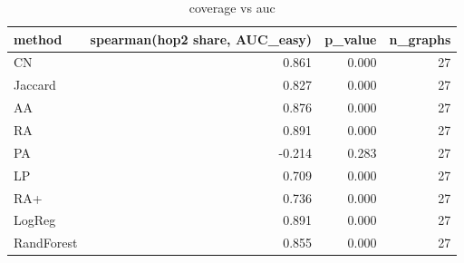 \begin{table}[t]
\centering
\caption{coverage vs auc}
\label{tab:coverage_vs_auc}
\begin{tabular}{lrrr}
\hline
method & spearman(hop2 share, AUC\_easy) & p\_value & n\_graphs \\
\hline
CN & 0.861 & 0.000 & 27 \\
Jaccard & 0.827 & 0.000 & 27 \\
AA & 0.876 & 0.000 & 27 \\
RA & 0.891 & 0.000 & 27 \\
PA & -0.214 & 0.283 & 27 \\
LP & 0.709 & 0.000 & 27 \\
RA+ & 0.736 & 0.000 & 27 \\
LogReg & 0.891 & 0.000 & 27 \\
RandForest & 0.855 & 0.000 & 27 \\
\hline
\end{tabular}
\end{table}
